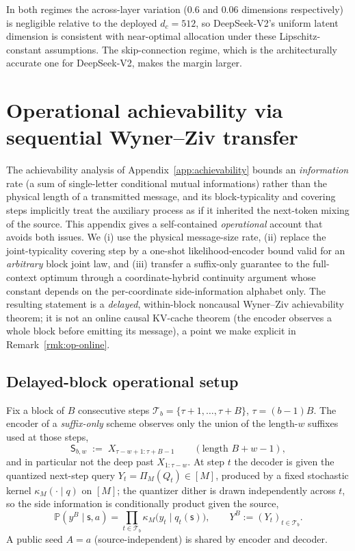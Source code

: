 \documentclass[11pt]{article}
\newcommand{\Prob}{\mathbb{P}}
\theoremstyle{plain}
\theoremstyle{definition}
\theoremstyle{remark}
\begin{document}
In both regimes the across-layer variation ($0.6$ and $0.06$
dimensions respectively) is negligible relative to the deployed
$d_c = 512$, so DeepSeek-V2's uniform latent dimension is
consistent with near-optimal allocation under these
Lipschitz-constant assumptions. The skip-connection regime, which
is the architecturally accurate one for DeepSeek-V2, makes the
margin larger.

\section{Operational achievability via sequential Wyner--Ziv transfer}
\label{app:operational}

The achievability analysis of Appendix~\ref{app:achievability} bounds
an \emph{information} rate (a sum of single-letter conditional mutual
informations) rather than the physical length of a transmitted
message, and its block-typicality and covering steps implicitly treat
the auxiliary process as if it inherited the next-token mixing of the
source. This appendix gives a self-contained \emph{operational}
account that avoids both issues. We (i) use the physical message-size
rate, (ii) replace the joint-typicality covering step by a one-shot
likelihood-encoder bound valid for an \emph{arbitrary} block joint
law, and (iii) transfer a suffix-only guarantee to the full-context
optimum through a coordinate-hybrid continuity argument whose constant
depends on the per-coordinate side-information alphabet only. The
resulting statement is a \emph{delayed}, within-block noncausal
Wyner--Ziv achievability theorem; it is not an online causal
KV-cache theorem (the encoder observes a whole block before emitting
its message), a point we make explicit in
Remark~\ref{rmk:op-online}.

\subsection{Delayed-block operational setup}
\label{app:op-setup}

Fix a block of $B$ consecutive steps
$\mathcal T_b=\{\tau+1,\dots,\tau+B\}$, $\tau=(b-1)B$. The encoder of
a \emph{suffix-only} scheme observes only the union of the length-$w$
suffixes used at those steps,
\[
\mathsf S_{b,w}\;:=\;X_{\tau-w+1:\tau+B-1}\qquad(\text{length }B+w-1),
\]
and in particular not the deep past $X_{1:\tau-w}$. At step $t$ the
decoder is given the quantized next-step query
$Y_t=\Pi_M(Q_t)\in[M]$, produced by a fixed stochastic kernel
$\kappa_M(\cdot\mid q)$ on $[M]$; the quantizer dither is drawn
independently across $t$, so the side information is conditionally
product given the source,
\begin{equation}
\label{eq:op-cond-product}
\Prob(y^B\mid \mathsf s,a)=\prod_{t\in\mathcal T_b}\kappa_M\!\bigl(y_t\mid q_t(\mathsf s)\bigr),
\qquad Y^B:=(Y_t)_{t\in\mathcal T_b}.
\end{equation}
A public seed $A=a$ (source-independent) is shared by encoder and
decoder.
\end{document}
